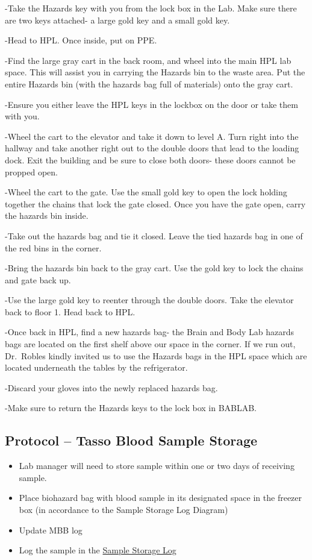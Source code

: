 \documentclass[]{book}
\begin{document}
-Take the Hazards key with you from the lock box in the Lab. Make sure there are two keys attached- a large gold key and a small gold key.

-Head to HPL. Once inside, put on PPE.

-Find the large gray cart in the back room, and wheel into the main HPL lab space. This will assist you in carrying the Hazards bin to the waste area. Put the entire Hazards bin (with the hazards bag full of materials) onto the gray cart.

-Ensure you either leave the HPL keys in the lockbox on the door or take them with you.

-Wheel the cart to the elevator and take it down to level A. Turn right into the hallway and take another right out to the double doors that lead to the loading dock. Exit the building and be sure to close both doors- these doors cannot be propped open.

-Wheel the cart to the gate. Use the small gold key to open the lock holding together the chains that lock the gate closed. Once you have the gate open, carry the hazards bin inside.

-Take out the hazards bag and tie it closed. Leave the tied hazards bag in one of the red bins in the corner.

-Bring the hazards bin back to the gray cart. Use the gold key to lock the chains and gate back up.

-Use the large gold key to reenter through the double doors. Take the elevator back to floor 1. Head back to HPL.

-Once back in HPL, find a new hazards bag- the Brain and Body Lab hazards bags are located on the first shelf above our space in the corner. If we run out, Dr.~Robles kindly invited us to use the Hazards bags in the HPL space which are located underneath the tables by the refrigerator.

-Discard your gloves into the newly replaced hazards bag.

-Make sure to return the Hazards keys to the lock box in BABLAB.

\hypertarget{protocol-tasso-blood-sample-storage}{%
\subsection{Protocol -- Tasso Blood Sample Storage}\label{protocol-tasso-blood-sample-storage}}

\begin{itemize}
\item
  Lab manager will need to store sample within one or two days of receiving sample.
\item
  Place biohazard bag with blood sample in its designated space in the freezer box (in accordance to the Sample Storage Log Diagram)
\item
  Update MBB log
\item
  Log the sample in the \href{https://app.box.com/file/630322897864}{Sample Storage Log}
\end{itemize}
\end{document}
